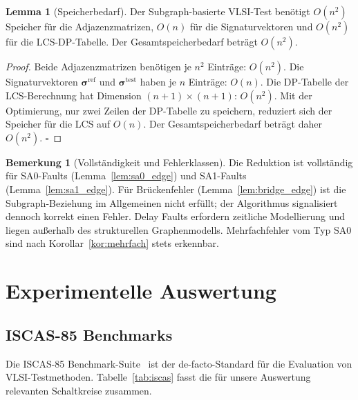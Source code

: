 ﻿\documentclass[a4paper,12pt]{article}
\theoremstyle{definition}
\newtheorem{lemma}{Lemma}
\newtheorem{bemerkung}{Bemerkung}
\begin{document}
\begin{lemma}[Speicherbedarf]
  \label{lem:speicher}
  Der Subgraph-basierte VLSI-Test benötigt $O(n^2)$ Speicher für die
  Adjazenzmatrizen, $O(n)$ für die Signaturvektoren und $O(n^2)$ für
  die LCS-DP-Tabelle. Der Gesamtspeicherbedarf beträgt $O(n^2)$.
\end{lemma}

\begin{proof}
  Beide Adjazenzmatrizen benötigen je $n^2$ Einträge: $O(n^2)$.
  Die Signaturvektoren $\boldsymbol{\sigma}^{\mathrm{ref}}$ und
  $\boldsymbol{\sigma}^{\mathrm{test}}$ haben je $n$ Einträge: $O(n)$.
  Die DP-Tabelle der LCS-Berechnung hat Dimension $(n+1)\times(n+1)$:
  $O(n^2)$. Mit der Optimierung, nur zwei Zeilen der DP-Tabelle zu
  speichern, reduziert sich der Speicher für die LCS auf $O(n)$.
  Der Gesamtspeicherbedarf beträgt daher $O(n^2)$. $\square$
\end{proof}

\begin{bemerkung}[Vollständigkeit und Fehlerklassen]
  Die Reduktion ist vollständig für SA0-Faults (Lemma~\ref{lem:sa0_edge})
  und SA1-Faults (Lemma~\ref{lem:sa1_edge}).
  Für Brückenfehler (Lemma~\ref{lem:bridge_edge}) ist die
  Subgraph-Beziehung im Allgemeinen nicht erfüllt; der Algorithmus
  signalisiert dennoch korrekt einen Fehler.
  Delay Faults erfordern zeitliche Modellierung und liegen außerhalb
  des strukturellen Graphenmodells.
  Mehrfachfehler vom Typ SA0 sind nach
  Korollar~\ref{kor:mehrfach} stets erkennbar.
\end{bemerkung}

\section{Experimentelle Auswertung}
\label{sec:experimente}

\subsection{ISCAS-85 Benchmarks}

Die ISCAS-85 Benchmark-Suite~\cite{brglez1985combinational} ist der
de-facto-Standard für die Evaluation von VLSI-Testmethoden.
Tabelle~\ref{tab:iscas} fasst die für unsere Auswertung relevanten
Schaltkreise zusammen.
\end{document}
